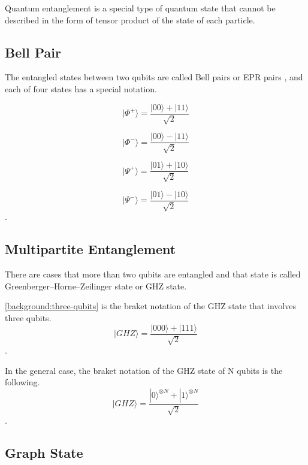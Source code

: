 Quantum entanglement is a special type of quantum state that cannot be described in the form of tensor product of the state of each particle.

\subsection{Bell Pair}
The entangled states between two qubits are called Bell pairs or EPR pairs \cite{PhysRev.47.777}, and each of four states has a special notation.

\begin{equation}
  |\Phi^+\rangle = \frac{|00\rangle + |11\rangle}{\sqrt{2}}
  \end{equation}
  
  \begin{equation}
 |\Phi^-\rangle = \frac{|00\rangle - |11\rangle}{\sqrt{2}}
 \end{equation}
 
 \begin{equation}
 |\Psi^+\rangle = \frac{|01\rangle + |10\rangle}{\sqrt{2}}
 \end{equation}
 
 \begin{equation}
  |\Psi^-\rangle = \frac{|01\rangle - |10\rangle}{\sqrt{2}}
  \end{equation}.

\subsection{Multipartite Entanglement}
There are cases that more than two qubits are entangled and that state is called Greenberger–Horne–Zeilinger state or GHZ state.

\ref{background:three-qubits} is the braket notation of the GHZ state that involves three qubits.
\begin{equation}
  |GHZ\rangle = \frac{|000\rangle + |111\rangle}{\sqrt{2}}
  \label{background:three-qubits}
\end{equation}.

In the general case, the braket notation of the GHZ state of N qubits is the following.
\begin{equation}
  |GHZ\rangle = \frac{|0\rangle^{\otimes N} + |1\rangle^{\otimes N}}{\sqrt{2}}
\end{equation}.

\subsection{Graph State}

